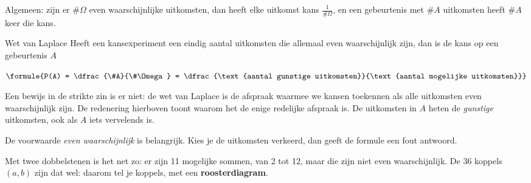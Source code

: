 Algemeen: zijn er $\#\Omega$ even waarschijnlijke uitkomsten, dan heeft elke uitkomst kans $\frac{1}{\#\Omega}$, en een gebeurtenis met $\#A$ uitkomsten heeft $\#A$ keer die kans.

\begin{theorie}
\begin{stelling}{Wet van Laplace}
Heeft een kansexperiment een eindig aantal uitkomsten die allemaal even waarschijnlijk zijn, dan is de kans op een gebeurtenis $A$

\vspace{1mm}
\qquad $\formule{P(A) = \dfrac{\#A}{\#\Omega} = \dfrac{\text{aantal gunstige uitkomsten}}{\text{aantal mogelijke uitkomsten}}}$
\end{stelling}
\end{theorie}

Een bewijs in de strikte zin is er niet: de wet van Laplace is de afspraak waarmee we kansen toekennen als alle uitkomsten even waarschijnlijk zijn. De redenering hierboven toont waarom het de enige redelijke afspraak is. De uitkomsten in $A$ heten de \textit{gunstige} uitkomsten, ook als $A$ iets vervelends is.

De voorwaarde \textit{even waarschijnlijk} is belangrijk. Kies je de uitkomsten verkeerd, dan geeft de formule een fout antwoord.


Met twee dobbelstenen is het net zo: er zijn 11 mogelijke sommen, van 2 tot 12, maar die zijn niet even waarschijnlijk. De 36 koppels $(a, b)$ zijn dat wel: daarom tel je koppels, met een \textbf{roosterdiagram}.

